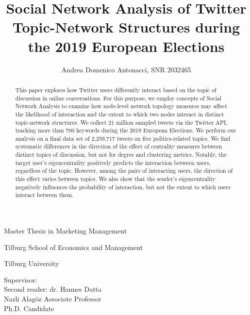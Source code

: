 \documentclass[a4paper,12pt]{article}
\title{Social Network Analysis of Twitter Topic-Network Structures during the 2019 European Elections}
\author{Andrea Domenico Antonacci, SNR 2032465}
\begin{document}
{ %
\maketitle\thispagestyle{empty}
\vspace{1cm}
{\large {Master Thesis in Marketing Management\par Tilburg School of Economics and Management\par Tilburg University\par}}
}
\vspace{1cm}
{
\begin{multicols}{3}
\raggedright
Supervisor:\\Second reader:
\vfill\null
\columnbreak
dr. Hannes Datta\\Nazli Alagöz
\vfill\null
\columnbreak
Associate Professor\\Ph.D. Candidate
\end{multicols}
}

{ %
\newpage
{}
\hypersetup{linkcolor=black} %
\tableofcontents
}

\newpage
\begin{abstract}
This paper explores how Twitter users differently interact based on the topic of discussion in online conversations. For this purpose, we employ concepts of Social Network Analysis to examine how node-level network topology measures may affect the likelihood of interaction and the extent to which two nodes interact in distinct topic-network structures. We collect 21 million sampled tweets via the Twitter API, tracking more than 700 keywords during the 2019 European Elections. We perform our analysis on a final data set of 2,259,717 tweets on five politics-related topics. We find systematic differences in the direction of the effect of centrality measures between distinct topics of discussion, but not for degree and clustering metrics. Notably, the target user’s eigencentrality positively predicts the interaction between users, regardless of the topic. However, among the pairs of interacting users, the direction of this effect varies between topics. We also show that the sender’s eigencentrality negatively influences the probability of interaction, but not the extent to which users interact between them.
\end{abstract}
\end{document}
